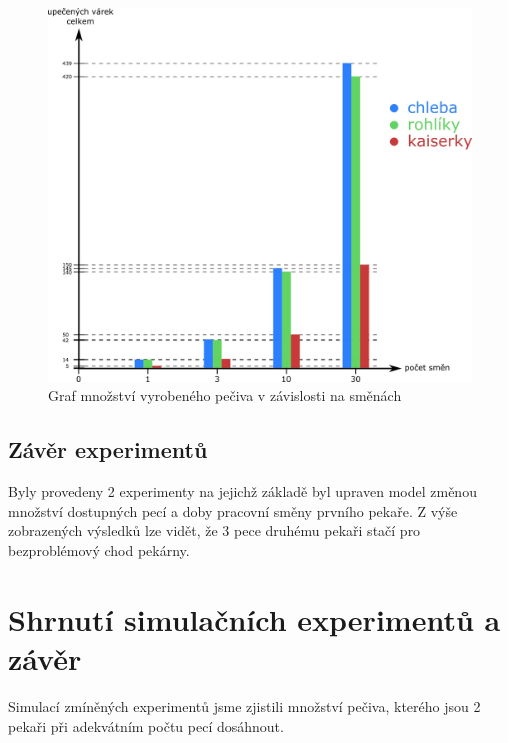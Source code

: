 \documentclass[11pt]{article}
\begin{document}
\begin{figure}[H]
  \includegraphics[width=\linewidth]{smeny.jpg}
  \caption{Graf množství vyrobeného pečiva v závislosti na směnách}
  \label{fig:smeny}
\end{figure}

\subsection{Závěr experimentů}
Byly provedeny 2 experimenty na jejichž základě byl upraven model změnou množství dostupných pecí a doby pracovní směny prvního pekaře. Z výše zobrazených výsledků lze vidět, že 3 pece druhému pekaři stačí pro bezproblémový chod pekárny.  

\section{Shrnutí simulačních experimentů a závěr}
Simulací zmíněných experimentů jsme zjistili množství pečiva, kterého jsou 2 pekaři při adekvátním počtu pecí dosáhnout. 

\newpage


{}

\end{document}
